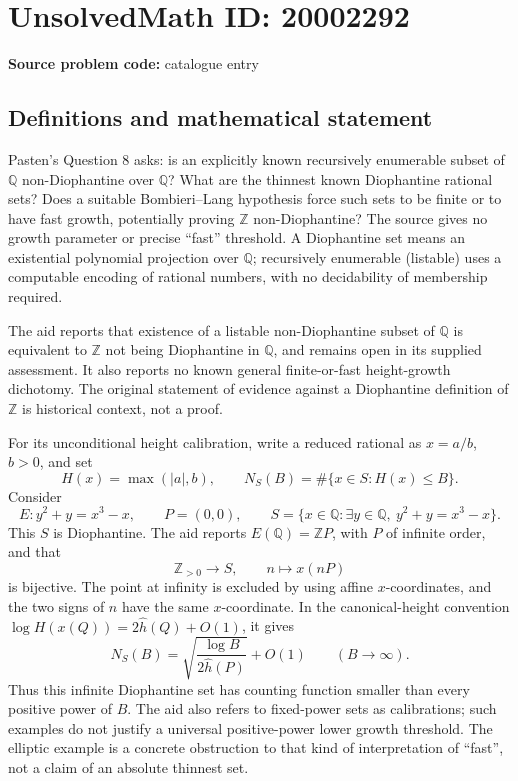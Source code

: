 \documentclass[11pt]{article}
\newcommand{\Z}{\mathbb{Z}}
\newcommand{\Q}{\mathbb{Q}}
\begin{document}
\section*{UnsolvedMath ID: 20002292}
\textbf{Source problem code:} catalogue entry
\subsection{Definitions and mathematical statement}
Pasten's Question 8 asks: is an explicitly known recursively enumerable subset of \(\Q\) non-Diophantine over \(\Q\)? What are the thinnest known Diophantine rational sets? Does a suitable Bombieri--Lang hypothesis force such sets to be finite or to have fast growth, potentially proving \(\Z\) non-Diophantine? The source gives no growth parameter or precise ``fast'' threshold. A Diophantine set means an existential polynomial projection over \(\Q\); recursively enumerable (listable) uses a computable encoding of rational numbers, with no decidability of membership required.

The aid reports that existence of a listable non-Diophantine subset of \(\Q\) is equivalent to \(\Z\) not being Diophantine in \(\Q\), and remains open in its supplied assessment. It also reports no known general finite-or-fast height-growth dichotomy. The original statement of evidence against a Diophantine definition of \(\Z\) is historical context, not a proof.

For its unconditional height calibration, write a reduced rational as \(x=a/b\), \(b>0\), and set
\[
 H(x)=\max(|a|,b),\qquad N_S(B)=\#\{x\in S:H(x)\le B\}.
\]
Consider
\[
 E:y^2+y=x^3-x,\qquad P=(0,0),\qquad
 S=\{x\in\Q:\exists y\in\Q,\ y^2+y=x^3-x\}.
\]
This \(S\) is Diophantine. The aid reports \(E(\Q)=\Z P\), with \(P\) of infinite order, and that
\[
 \Z_{>0}\longrightarrow S,\qquad n\longmapsto x(nP)
\]
is bijective. The point at infinity is excluded by using affine \(x\)-coordinates, and the two signs of \(n\) have the same \(x\)-coordinate. In the canonical-height convention
\(\log H(x(Q))=2\widehat h(Q)+O(1)\), it gives
\[
 N_S(B)=\sqrt{\frac{\log B}{2\widehat h(P)}}+O(1)
 \qquad(B\to\infty).
\]
Thus this infinite Diophantine set has counting function smaller than every positive power of \(B\). The aid also refers to fixed-power sets as calibrations; such examples do not justify a universal positive-power lower growth threshold. The elliptic example is a concrete obstruction to that kind of interpretation of ``fast'', not a claim of an absolute thinnest set.
\end{document}
